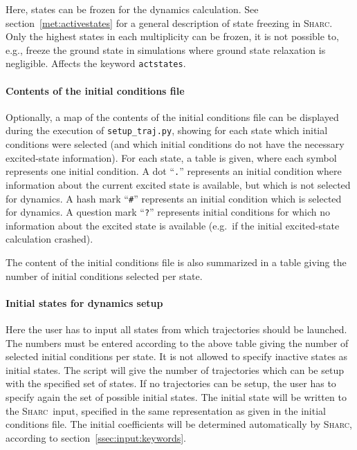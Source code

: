 \documentclass[a4paper,11pt,DIV=15,openany,twoside=false]{scrbook}
\newcommand{\sharc}{\textsc{Sharc}}
\newcommand{\ttt}[1]{\texttt{#1}}
\begin{document}
Here, states can be frozen for the dynamics calculation. See section~\ref{met:activestates} for a general description of state freezing in \sharc. Only the highest states in each multiplicity can be frozen, it is not possible to, e.g., freeze the ground state in simulations where ground state relaxation is negligible. Affects the keyword \ttt{actstates}.

\paragraph{Contents of the initial conditions file}

Optionally, a map of the contents of the initial conditions file can be displayed during the execution of \ttt{setup\_traj.py}, showing for each state which initial conditions were selected (and which initial conditions do not have the necessary excited-state information). For each state, a table is given, where each symbol represents one initial condition. A dot ``\ttt{.}'' represents an initial condition where information about the current excited state is available, but which is not selected for dynamics. A hash mark ``\ttt{\#}'' represents an initial condition which is selected for dynamics. A question mark ``\ttt{?}'' represents initial conditions for which no information about the excited state is available (e.g.\ if the initial excited-state calculation crashed).

The content of the initial conditions file is also summarized in a table giving the number of initial conditions selected per state. 

\paragraph{Initial states for dynamics setup}

Here the user has to input all states from which trajectories should be launched. The numbers must be entered according to the above table giving the number of selected initial conditions per state. It is not allowed to specify inactive states as initial states. The script will give the number of trajectories which can be setup with the specified set of states. If no trajectories can be setup, the user has to specify again the set of possible initial states. The initial state will be written to the \sharc\ input, specified in the same representation as given in the initial conditions file. The initial coefficients will be determined automatically by \sharc, according to section~\ref{ssec:input:keywords}.
\end{document}
